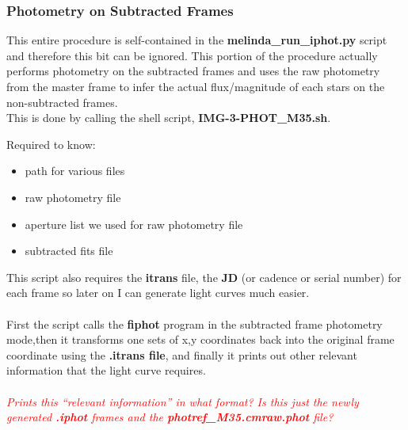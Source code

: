 \subsubsection*{Photometry on Subtracted Frames}
This entire procedure is self-contained in the \textbf{melinda\_run\_iphot.py} script and therefore this bit can be ignored. 
This portion of the procedure actually performs photometry on the subtracted frames and uses the raw photometry from the master frame to infer the actual flux/magnitude of each stars on the non-subtracted frames. \\
This is done by calling the shell script, \textbf{IMG-3-PHOT\_M35.sh}.

Required to know:
\begin{itemize}
\item path for various files
\item raw photometry file
\item aperture list we used for raw photometry file
\item subtracted fits file
\end{itemize}
This script also requires the \textbf{itrans} file, the \textbf{JD} (or cadence or serial number) for each frame so later on I can generate light curves much easier. \\ \\
First the script calls the \textbf{fiphot} program in the subtracted frame photometry mode,then it transforms one sets of x,y coordinates back into the original frame coordinate using the \textbf{.itrans file}, and finally it prints out other relevant information that the light curve requires. \\ \\
 \textcolor{red}{\textit{Prints this ``relevant information'' in what format? Is this just the newly generated \textbf{.iphot} frames and the \textbf{photref\_M35.cmraw.phot} file?}}